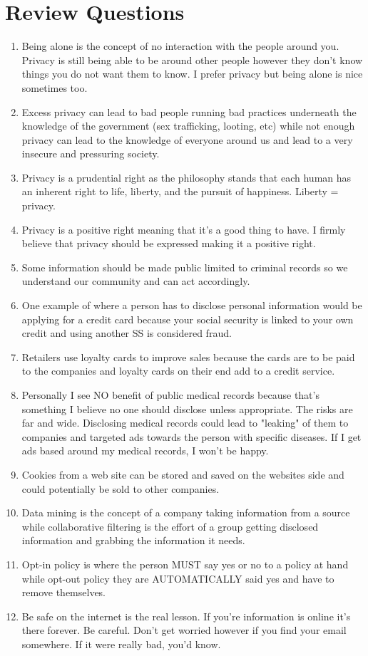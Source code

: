 \documentclass[12pt]{article}
\begin{document}
\section{Review Questions}
    \begin{enumerate}
        \item Being alone is the concept of no interaction with the people around you. Privacy is still being able to be around other people however they don't know things you do not want them to know. I prefer privacy but being alone is nice sometimes too.
        \item Excess privacy can lead to bad people running bad practices underneath the knowledge of the government (sex trafficking, looting, etc) while not enough privacy can lead to the knowledge of everyone around us and lead to a very insecure and pressuring society.
        \item Privacy is a prudential right as the philosophy stands that each human has an inherent right to life, liberty, and the pursuit of happiness. Liberty = privacy.
        \item Privacy is a positive right meaning that it's a good thing to have. I firmly believe that privacy should be expressed making it a positive right.
        \item Some information should be made public limited to criminal records so we understand our community and can act accordingly.
        \item One example of where a person has to disclose personal information would be applying for a credit card because your social security is linked to your own credit and using another SS is considered fraud.
        \item Retailers use loyalty cards to improve sales because the cards are to be paid to the companies and loyalty cards on their end add to a credit service.
        \item Personally I see NO benefit of public medical records because that's something I believe no one should disclose unless appropriate. The risks are far and wide. Disclosing medical records could lead to "leaking" of them to companies and targeted ads towards the person with specific diseases. If I get ads based around my medical records, I won't be happy.
        \item Cookies from a web site can be stored and saved on the websites side and could potentially be sold to other companies.
        \item Data mining is the concept of a company taking information from a source while collaborative filtering is the effort of a group getting disclosed information and grabbing the information it needs.
        \item Opt-in policy is where the person MUST say yes or no to a policy at hand while opt-out policy they are AUTOMATICALLY said yes and have to remove themselves.
        \item Be safe on the internet is the real lesson. If you're information is online it's there forever. Be careful. Don't get worried however if you find your email somewhere. If it were really bad, you'd know.
    \end{enumerate}
\end{document}
